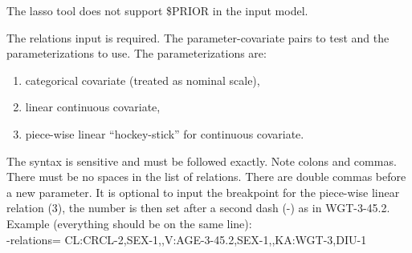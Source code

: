 The lasso tool does not support \$PRIOR in the input model.
\begin{optionlist}
The relations input is required. The parameter-covariate pairs to test and the parameterizations to use. The parameterizations are:
\begin{enumerate}
	\item categorical covariate (treated as nominal scale),
	\item linear continuous covariate,
	\item piece-wise linear “hockey-stick” for continuous covariate.
\end{enumerate}

The syntax is sensitive and must be followed exactly. Note colons and commas. There must be no spaces in the list of relations. There are double commas before a new parameter. It is optional to input the breakpoint for the piece-wise linear relation (3), the number is then set after a second dash (-) as in WGT-3-45.2. 
\\Example (everything should be on the same line):\\
	-relations= CL:CRCL-2,SEX-1,,V:AGE-3-45.2,SEX-1,,KA:WGT-3,DIU-1
\end{optionlist}
\newpage
